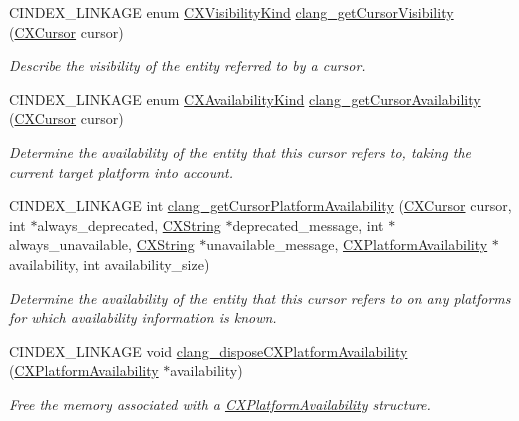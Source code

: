 \begin{DoxyCompactItemize}
C\+I\+N\+D\+E\+X\+\_\+\+L\+I\+N\+K\+A\+GE enum \hyperlink{group__CINDEX__CURSOR__MANIP_gaf92fafb489ab66529aceab51818994cb}{C\+X\+Visibility\+Kind} \hyperlink{group__CINDEX__CURSOR__MANIP_ga935b442bd6bde168cf354b7629b471d8}{clang\+\_\+get\+Cursor\+Visibility} (\hyperlink{structCXCursor}{C\+X\+Cursor} cursor)
\begin{DoxyCompactList}\small\item\em Describe the visibility of the entity referred to by a cursor. \end{DoxyCompactList}\item 
C\+I\+N\+D\+E\+X\+\_\+\+L\+I\+N\+K\+A\+GE enum \hyperlink{group__CINDEX_gada331ea0195e952c8f181ecf15e83d71}{C\+X\+Availability\+Kind} \hyperlink{group__CINDEX__CURSOR__MANIP_gab44e2a565fa40a0e0fc0f130f618a9b5}{clang\+\_\+get\+Cursor\+Availability} (\hyperlink{structCXCursor}{C\+X\+Cursor} cursor)
\begin{DoxyCompactList}\small\item\em Determine the availability of the entity that this cursor refers to, taking the current target platform into account. \end{DoxyCompactList}\item 
C\+I\+N\+D\+E\+X\+\_\+\+L\+I\+N\+K\+A\+GE int \hyperlink{group__CINDEX__CURSOR__MANIP_gaab07659398c4538771d62c81ca5dea69}{clang\+\_\+get\+Cursor\+Platform\+Availability} (\hyperlink{structCXCursor}{C\+X\+Cursor} cursor, int $\ast$always\+\_\+deprecated, \hyperlink{structCXString}{C\+X\+String} $\ast$deprecated\+\_\+message, int $\ast$always\+\_\+unavailable, \hyperlink{structCXString}{C\+X\+String} $\ast$unavailable\+\_\+message, \hyperlink{structCXPlatformAvailability}{C\+X\+Platform\+Availability} $\ast$availability, int availability\+\_\+size)
\begin{DoxyCompactList}\small\item\em Determine the availability of the entity that this cursor refers to on any platforms for which availability information is known. \end{DoxyCompactList}\item 
\mbox{\label{group__CINDEX__CURSOR__MANIP_ga1acfac399add40f7240e02f9f5f1a6d9}} 
C\+I\+N\+D\+E\+X\+\_\+\+L\+I\+N\+K\+A\+GE void \hyperlink{group__CINDEX__CURSOR__MANIP_ga1acfac399add40f7240e02f9f5f1a6d9}{clang\+\_\+dispose\+C\+X\+Platform\+Availability} (\hyperlink{structCXPlatformAvailability}{C\+X\+Platform\+Availability} $\ast$availability)
\begin{DoxyCompactList}\small\item\em Free the memory associated with a {\ttfamily \hyperlink{structCXPlatformAvailability}{C\+X\+Platform\+Availability}} structure. \end{DoxyCompactList}\item 

\end{DoxyCompactItemize}
